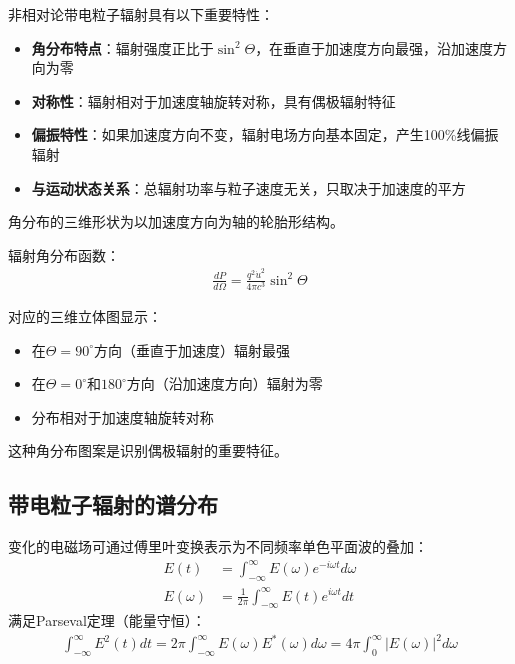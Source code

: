 \begin{derivationnote}[辐射的角分布与偏振特性]
非相对论带电粒子辐射具有以下重要特性：

\begin{itemize}
\item \textbf{角分布特点}：辐射强度正比于$\sin^2\Theta$，在垂直于加速度方向最强，沿加速度方向为零
\item \textbf{对称性}：辐射相对于加速度轴旋转对称，具有偶极辐射特征
\item \textbf{偏振特性}：如果加速度方向不变，辐射电场方向基本固定，产生100\%线偏振辐射
\item \textbf{与运动状态关系}：总辐射功率与粒子速度无关，只取决于加速度的平方
\end{itemize}

角分布的三维形状为以加速度方向为轴的轮胎形结构。
\end{derivationnote}


\begin{example}[角分布的立体图示]
辐射角分布函数：
\begin{align}
\frac{dP}{d\Omega} = \frac{q^2 \dot{u}^2}{4\pi c^3} \sin^2\Theta
\end{align}

对应的三维立体图显示：
\begin{itemize}
\item 在$\Theta = 90^\circ$方向（垂直于加速度）辐射最强
\item 在$\Theta = 0^\circ$和$180^\circ$方向（沿加速度方向）辐射为零
\item 分布相对于加速度轴旋转对称
\end{itemize}

这种角分布图案是识别偶极辐射的重要特征。
\end{example}


\subsection{带电粒子辐射的谱分布}

\begin{definition}[傅里叶变换与Parseval定理]
变化的电磁场可通过傅里叶变换表示为不同频率单色平面波的叠加：
\begin{align}
E(t) &= \int_{-\infty}^{\infty} E(\omega) e^{-i\omega t} d\omega \\
E(\omega) &= \frac{1}{2\pi} \int_{-\infty}^{\infty} E(t) e^{i\omega t} dt
\end{align}
满足Parseval定理（能量守恒）：
\begin{align}
\int_{-\infty}^{\infty} E^2(t) dt = 2\pi \int_{-\infty}^{\infty} E(\omega)E^*(\omega) d\omega = 4\pi \int_0^{\infty} |E(\omega)|^2 d\omega
\end{align}
\end{definition}

